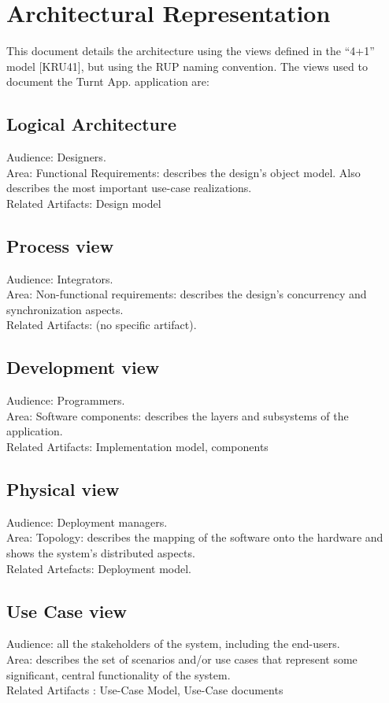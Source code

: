 \documentclass[10pt,a4paper]{article}
\begin{document}
\section{Architectural Representation }
This document details the architecture using the views defined in the “4+1” model [KRU41], but using the 	RUP naming convention. The views used to document the Turnt App. application are:
\subsection{Logical Architecture}

Audience: Designers.\\
Area: Functional Requirements: describes the design's object model. Also describes the most important use-case realizations.\\
Related Artifacts: Design model\\

\subsection{Process view}
Audience: Integrators.\\
Area: Non-functional requirements: describes the design's concurrency and synchronization aspects.\\
Related Artifacts: (no specific artifact).\\


\subsection{Development view }
Audience: Programmers.\\
Area: Software components: describes the layers and subsystems of the application.\\
Related Artifacts: Implementation model, components\\

\subsection{Physical view} 
Audience: Deployment managers.\\
Area: Topology: describes the mapping of the software onto the hardware and shows the system's distributed aspects.\\
Related Artefacts: Deployment model.\\

\subsection{Use Case view}
Audience: all the stakeholders of the system, including the end-users.\\
Area: describes the set of scenarios and/or use cases that represent some significant, central functionality of the system.\\
Related Artifacts : Use-Case Model, Use-Case documents\\
\end{document}
